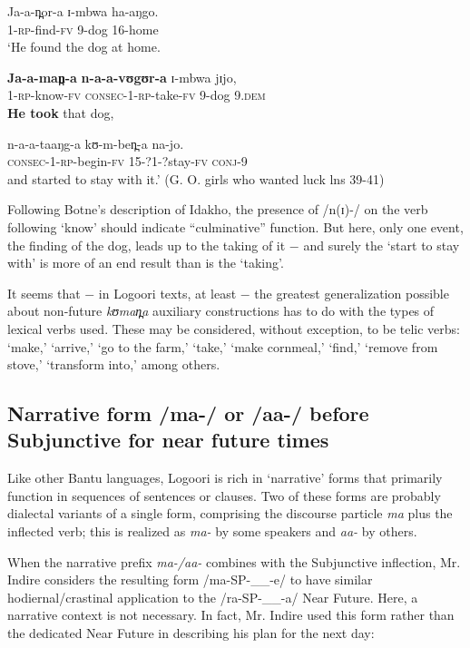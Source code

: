 \documentclass[output=paper]{langsci/langscibook}
\begin{document}
\ea\label{ex:sarvasy:27}
\gll Ja-a-n̪or-a   ɪ{}-mbwa   ha-aŋgo. \\
1-\textsc{rp}{}-find-\textsc{fv}  9-dog    16-home \\
\glt ‘He found the dog at home.

\gll \textbf{Ja-a-man̪-a}   \textbf{n-a-a-vʊgʊr-a}     ɪ{}-mbwa   jɪjo, \\
1-\textsc{rp}{}-know-\textsc{fv}  \textsc{consec}{}-1-\textsc{rp}{}-take-\textsc{fv}  9-dog    9.\textsc{dem} \\
\glt \textbf{He took} that dog,

\gll n-a-a-taaŋg-a       kʊ-m-ben̪-a     na-jo. \\
\textsc{consec}{}-1-\textsc{rp}{}-begin-\textsc{fv}  15-?1-?stay-\textsc{fv}  \textsc{conj}{}-9 \\
\glt and started to stay with it.’ (G. O. girls who wanted luck lns 39-41)
\z 

Following Botne’s description of Idakho, the presence of /n(ɪ)-/ on the verb following ‘know’ should indicate “culminative” function. But here, only one event, the finding of the dog, leads up to the taking of it $-$ and surely the ‘start to stay with’ is more of an end result than is the ‘taking’.

It seems that $-$ in Logoori texts, at least $-$ the greatest generalization possible about non-future \textit{kʊman̪a }auxiliary constructions has to do with the types of lexical verbs used. These may be considered, without exception, to be telic verbs: ‘make,’ ‘arrive,’ ‘go to the farm,’ ‘take,’ ‘make cornmeal,’ ‘find,’ ‘remove from stove,’ ‘transform into,’ among others.

\subsection{Narrative form /ma-/ or /aa-/ before Subjunctive for near future times} \label{sec:sarvasy:7.4}

Like other Bantu languages, Logoori is rich in ‘narrative’ %
%
forms that primarily function in sequences of sentences or clauses. Two of these forms are probably dialectal variants of a single form, comprising the discourse particle \textit{ma }plus the inflected verb; this is realized as \textit{ma-} by some speakers and \textit{aa-} by others.

When the narrative prefix \textit{ma-/aa-} combines with the Subjunctive inflection, Mr. Indire considers the resulting form /ma-SP-\_\_-e/ to have similar hodiernal/crastinal application to the /ra-SP-\_\_-a/ Near Future. Here, a narrative context is not necessary. In fact, Mr. Indire used this form rather than the dedicated Near Future in describing his plan for the next day:
\end{document}

